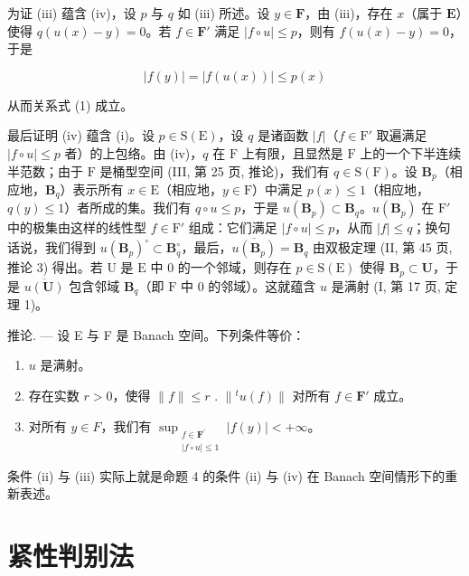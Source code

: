 为证 (iii) 蕴含 (iv)，设 \(p\) 与 \(q\) 如 (iii) 所述。设 \(y \in \mathbf{F}\)，由 (iii)，存在 \(x\)（属于 \(\mathbf{E}\)）使得 \(q(u(x) - y) = 0\)。若 \(f \in \mathbf{F}'\) 满足 \(|f \circ u| \leqslant p\)，则有 \(f(u(x) - y) = 0\)，于是

\[
\left| f (y) \right| = \left| f (u (x)) \right| \leqslant p (x)
\]

从而关系式 (1) 成立。

最后证明 (iv) 蕴含 (i)。设 \(p \in \mathrm{S}(\mathrm{E})\)，设 \(q\) 是诸函数 \(|f|\)（\(f \in \mathrm{F}'\) 取遍满足 \(|f \circ u| \leqslant p\) 者）的上包络。由 (iv)，\(q\) 在 \(\mathrm{F}\) 上有限，且显然是 \(\mathrm{F}\) 上的一个下半连续半范数；由于 \(\mathrm{F}\) 是桶型空间 (III, 第 25 页, 推论)，我们有 \(q \in \mathrm{S}(\mathrm{F})\)。设 \(\mathbf{B}_p\)（相应地，\(\mathbf{B}_q\)）表示所有 \(x \in \mathrm{E}\)（相应地，\(y \in \mathrm{F}\)）中满足 \(p(x) \leqslant 1\)（相应地，\(q(y) \leqslant 1\)）者所成的集。我们有 \(q \circ u \leqslant p\)，于是 \(u(\mathbf{B}_p) \subset \mathbf{B}_q\)。\(u(\mathbf{B}_p)\) 在 \(\mathrm{F}'\) 中的极集由这样的线性型 \(f \in \mathrm{F}'\) 组成：它们满足 \(|f \circ u| \leqslant p\)，从而 \(|f| \leqslant q\)；换句话说，我们得到 \(u(\mathbf{B}_p)^{\circ} \subset \mathbf{B}_q^{\circ}\)，最后，\(\overline{u(\mathbf{B}_p)} = \mathbf{B}_q\) 由双极定理 (II, 第 45 页, 推论 3) 得出。若 \(\mathrm{U}\) 是 \(\mathrm{E}\) 中 0 的一个邻域，则存在 \(p \in \mathrm{S}(\mathrm{E})\) 使得 \(\mathbf{B}_p \subset \mathbf{U}\)，于是 \(\overline{u(\mathbf{U})}\) 包含邻域 \(\mathbf{B}_q\)（即 \(\mathrm{F}\) 中 0 的邻域）。这就蕴含 \(u\) 是满射 (I, 第 17 页, 定理 1)。

推论. --- 设 E 与 F 是 Banach 空间。下列条件等价：

\begin{enumerate}
\def\labelenumi{(\roman{enumi})}
\item
  \(u\) 是满射。
\item
  存在实数 \(r > 0\)，使得 \(\| f \| \leqslant r\) . \(\| {}^t u(f) \|\) 对所有 \(f \in \mathbf{F}'\) 成立。
\item
  对所有 \(y \in F\)，我们有 \(\sup_{\substack{f\in \mathbf{F}^{\prime}\\ |f\circ u|\leqslant 1}} |f(y)| < +\infty\)。
\end{enumerate}

条件 (ii) 与 (iii) 实际上就是命题 4 的条件 (ii) 与 (iv) 在 Banach 空间情形下的重新表述。

\section{紧性判别法}


